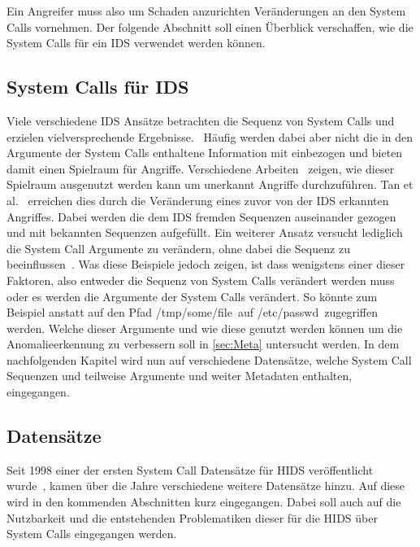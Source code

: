         Ein Angreifer muss also um Schaden anzurichten Veränderungen an den System Calls vornehmen.
        Der folgende Abschnitt soll einen Überblick verschaffen, wie die System Calls für ein \ac{IDS} verwendet werden können.

        \subsection{System Calls für IDS}
            Viele verschiedene \ac{IDS} Ansätze betrachten die Sequenz von System Calls und erzielen vielversprechende Ergebnisse.~\cite{MAGGI}
            Häufig werden dabei aber nicht die in den Argumente der System Calls enthaltene Information mit einbezogen und bieten damit einen Spielraum für Angriffe.
            Verschiedene Arbeiten~\cite{Syscallseqexploit1, Syscallseqexploit2, Syscallseqexploit3} zeigen, wie dieser Spielraum ausgenutzt werden kann um unerkannt Angriffe durchzuführen. 
            Tan et al.~\cite{Syscallseqexploit3} erreichen dies durch die Veränderung eines zuvor von der \ac{IDS} erkannten Angriffes.
            Dabei werden die dem \ac{IDS} fremden Sequenzen auseinander gezogen und mit bekannten Sequenzen aufgefüllt. 
            Ein weiterer Ansatz versucht lediglich die System Call Argumente zu verändern, ohne dabei die Sequenz zu beeinflussen~\cite{Syscallseqexploit1}.
            Was diese Beispiele jedoch zeigen, ist dass wenigstens einer dieser Faktoren, also entweder die Sequenz von System Calls verändert werden muss oder es werden die Argumente der System Calls verändert.
            So könnte zum Beispiel anstatt auf den Pfad \glqq /tmp/some/file\grqq \ auf \glqq /etc/passwd\grqq \ zugegriffen werden. 
            Welche dieser Argumente und wie diese genutzt werden können um die Anomalieerkennung zu verbessern soll in \autoref{sec:Meta} untersucht werden.
            In dem nachfolgenden Kapitel wird nun auf verschiedene Datensätze, welche System Call Sequenzen und teilweise Argumente und weiter Metadaten enthalten, eingegangen.

        \subsection{Datensätze}\label{sec:Datensatz}
            Seit 1998 einer der ersten System Call Datensätze für \ac{HIDS} veröffentlicht wurde~\cite{DARPA, KDD},
            kamen über die Jahre verschiedene weitere Datensätze hinzu.
            Auf diese wird in den kommenden Abschnitten kurz eingegangen.
            Dabei soll auch auf die Nutzbarkeit und die entstehenden Problematiken dieser für die \ac{HIDS} über System Calls eingegangen werden.

